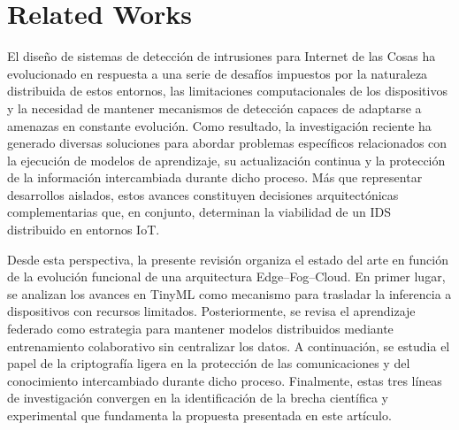 \documentclass[journal,article,submit,moreauthors]{Definitions/mdpi}
\begin{document}
\section{Related Works}
\label{related}

El diseño de sistemas de detección de intrusiones para Internet de las Cosas ha evolucionado en respuesta a una serie de desafíos impuestos por la naturaleza distribuida de estos entornos, las limitaciones computacionales de los dispositivos y la necesidad de mantener mecanismos de detección capaces de adaptarse a amenazas en constante evolución. Como resultado, la investigación reciente ha generado diversas soluciones para abordar problemas específicos relacionados con la ejecución de modelos de aprendizaje, su actualización continua y la protección de la información intercambiada durante dicho proceso. Más que representar desarrollos aislados, estos avances constituyen decisiones arquitectónicas complementarias que, en conjunto, determinan la viabilidad de un IDS distribuido en entornos IoT.

Desde esta perspectiva, la presente revisión organiza el estado del arte en función de la evolución funcional de una arquitectura Edge--Fog--Cloud. En primer lugar, se analizan los avances en TinyML como mecanismo para trasladar la inferencia a dispositivos con recursos limitados. Posteriormente, se revisa el aprendizaje federado como estrategia para mantener modelos distribuidos mediante entrenamiento colaborativo sin centralizar los datos. A continuación, se estudia el papel de la criptografía ligera en la protección de las comunicaciones y del conocimiento intercambiado durante dicho proceso. Finalmente, estas tres líneas de investigación convergen en la identificación de la brecha científica y experimental que fundamenta la propuesta presentada en este artículo.
\end{document}
